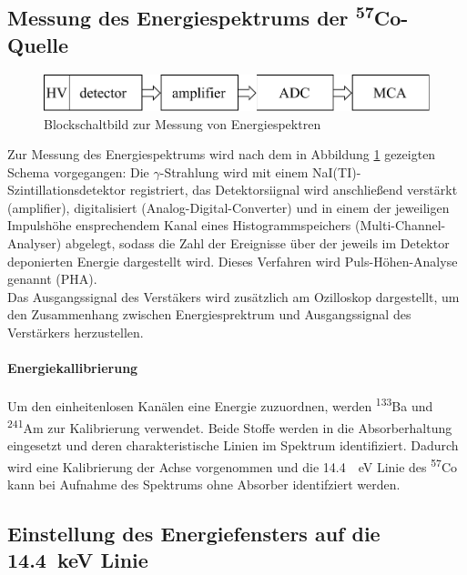 \documentclass[a4paper,twoside,final]{article}
\begin{document}
\subsection{Messung des Energiespektrums der \textsuperscript{57}Co-Quelle}
\begin{figure}[htp]
    \centering
    \includegraphics{Schaltungen/Blockschaltbild_Energiespektren.pdf}
    \caption{Blockschaltbild zur Messung von Energiespektren}
    \label{fig:BlockEnergiespektren}
\end{figure}

Zur Messung des Energiespektrums wird nach dem in Abbildung \ref{fig:BlockEnergiespektren} gezeigten Schema vorgegangen: Die $\gamma$-Strahlung wird mit einem NaI(TI)-Szintillationsdetektor registriert, das Detektorsiignal wird anschließend verstärkt (amplifier), digitalisiert (Analog-Digital-Converter) und in einem der jeweiligen Impulshöhe ensprechendem Kanal eines Histogrammspeichers (Multi-Channel-Analyser) abgelegt, sodass die Zahl der Ereignisse über der jeweils im Detektor deponierten Energie dargestellt wird. Dieses Verfahren wird Puls-Höhen-Analyse genannt (PHA). \\
Das Ausgangssignal des Verstäkers wird zusätzlich am Ozilloskop dargestellt, um den Zusammenhang zwischen Energiesprektrum und Ausgangssignal des Verstärkers herzustellen. \\
\paragraph{Energiekallibrierung}
Um den einheitenlosen Kanälen eine Energie zuzuordnen, werden \textsuperscript{133}Ba und \textsuperscript{241}Am zur Kalibrierung verwendet. Beide Stoffe werden in die Absorberhaltung eingesetzt und deren charakteristische Linien im Spektrum identifiziert. Dadurch wird eine Kalibrierung der Achse vorgenommen und die \SI{14,4}{\kili\eV} Linie des \textsuperscript{57}Co kann bei Aufnahme des Spektrums ohne Absorber identifziert werden.

\subsection{Einstellung des Energiefensters auf die \SI{14,4}{\kilo\eV} Linie}
\end{document}

